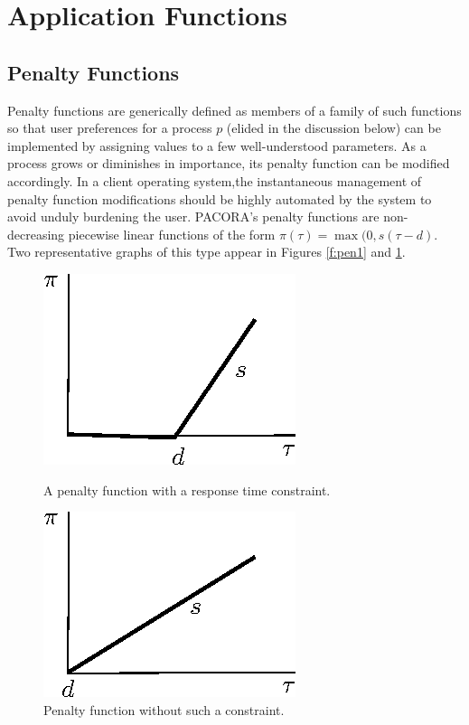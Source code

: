 \section{Application Functions}


\subsection*{Penalty Functions}

Penalty functions  are generically defined as members of a family of such functions
so that user preferences for a process $p$ (elided in the discussion below)
can be implemented by assigning values to a few well-understood parameters.
As a process grows or diminishes in importance, its penalty function can be modified accordingly.
In a client operating system,the instantaneous management of penalty function modifications
should be highly automated by the system to avoid unduly burdening the user.
PACORA's penalty functions are non-decreasing piecewise linear functions of the form
$\pi(\tau) = \max(0, s(\tau - d)$.
Two representative graphs of this type appear in Figures \ref{f:pen1} and \ref{f:pen2}.

\begin{figure}[b]
\parbox{1.6in}{
\includegraphics*{Penalty1.eps}
\caption{\label{f:pen1}A penalty function with a response time constraint.}
}  
\hspace{\fill}
\parbox{1.6in}{
\includegraphics*{Penalty2.eps}
\caption{\label{f:pen2}Penalty function without such a constraint.}
}
\end{figure}

